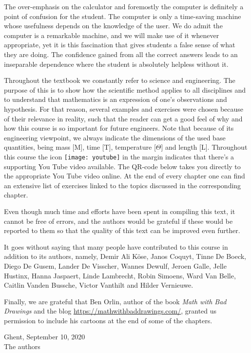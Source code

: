 The over-emphasis on the calculator and foremostly the computer is  definitely a point of confusion for the student. The computer is only a time-saving machine whose usefulness depends on the knowledge of the user. We do admit the computer is a remarkable machine, and we will make use of it whenever appropriate, yet it is this fascination that gives students a false sense of what they are doing. The confidence gained from all the correct answers leads to an inseparable dependence where the student is absolutely helpless without it.


Throughout the textbook we constantly refer to science and engineering. The purpose of this is to show how the scientific method applies to all disciplines and to understand that mathematics is an expression of one's observations and hypothesis. For that reason, several examples and exercises were chosen because of their relevance in reality, such that the reader can get a good feel of why and how this course is so important for future engineers. Note that because of its engineering viewpoint, we always indicate the dimensions of the used base quantities, being mass [M], time [T], temperature [$\Theta$] and length [L]. Throughout this course the icon  \texttt{[image: youtube]} in the margin indicates that there's a supporting You Tube video available. The QR-code below  takes you directly to the appropriate You Tube video online. At the end of every chapter one can find an extensive list of exercises linked to the topics discussed in the corresponding chapter. 

Even though much time and efforts have been spent in compiling this text, it cannot be free of errors, and the authors would be grateful if these would be reported to them so that the quality of this text can be improved even further.

It goes without saying that many people have contributed to this course in addition to its authors, namely, Demir Ali K\"ose, Janos Coquyt, Tinne De Boeck, Diego De Gusem, Lander De Visscher, Wannes Dewulf, Jeroen Galle, Jelle Hustinx, Hanna Jaspaert, Linde Lambrecht, Robin Simoens, Ward Van Belle, Caitlin Vanden Bussche, Victor Vanthilt and Hilder Vernieuwe. 

Finally, we are grateful that Ben Orlin, author of the book \textit{Math with Bad Drawings} and the blog \url{https://mathwithbaddrawings.com/}, granted us permission to include  his cartoons at the end of some of the  chapters. 
\vspace*{2cm}


\begin{flushleft}
Ghent, September 10, 2020\\[0.5cm]
The authors
\end{flushleft}
